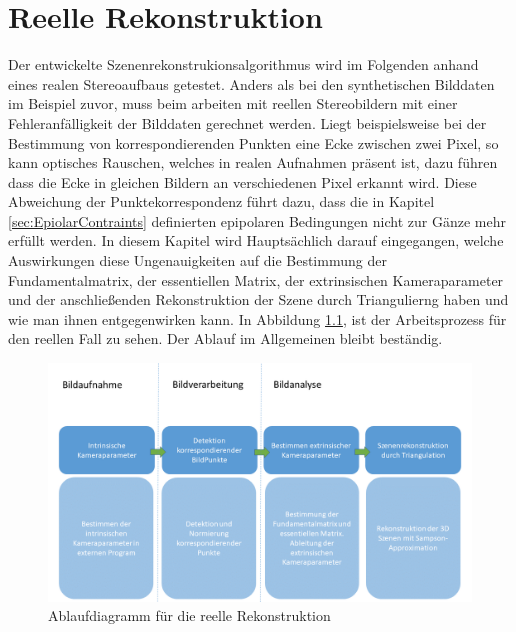 \chapter{Reelle Rekonstruktion}
\label{sec:real} 

Der entwickelte Szenenrekonstrukionsalgorithmus wird im Folgenden anhand eines realen Stereoaufbaus getestet. Anders als bei den synthetischen Bilddaten im Beispiel zuvor, muss beim arbeiten mit reellen Stereobildern mit einer Fehleranfälligkeit der Bilddaten gerechnet werden. Liegt beispielsweise bei der Bestimmung von korrespondierenden Punkten eine Ecke zwischen zwei Pixel, so kann optisches Rauschen, welches in realen Aufnahmen präsent ist, dazu führen dass die Ecke in gleichen Bildern an verschiedenen Pixel erkannt wird. Diese Abweichung der Punktekorrespondenz führt dazu, dass die in Kapitel \ref{sec:EpiolarContraints} definierten epipolaren Bedingungen nicht zur Gänze mehr erfüllt werden. In diesem Kapitel wird Hauptsächlich darauf eingegangen, welche Auswirkungen diese Ungenauigkeiten auf die Bestimmung der Fundamentalmatrix, der essentiellen Matrix, der extrinsischen Kameraparameter und der anschließenden Rekonstruktion der Szene durch Triangulierng haben und wie man ihnen entgegenwirken kann. In Abbildung \ref{fig:ArbeitsProzessReell}, ist der Arbeitsprozess für den reellen Fall zu sehen. Der Ablauf im Allgemeinen bleibt beständig.

%

\begin{figure}[!htb]
	\centering
	\includegraphics[width=1.\linewidth]{images/NEU_real_Arbeitsprozess.png}
	\caption[Ablaufdiagramm für die reelle Rekonstruktion]{Ablaufdiagramm für die reelle Rekonstruktion}
	\label{fig:ArbeitsProzessReell}
\end{figure}


